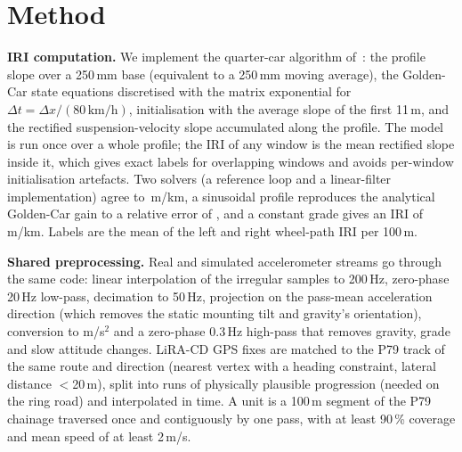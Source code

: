 \section{Method}
\label{sec:method}

\textbf{IRI computation.}
We implement the quarter-car algorithm of~\cite{sayers1995iri,astm_e1926}: the profile slope over a 250\,mm base (equivalent to a 250\,mm moving average), the Golden-Car state equations discretised with the matrix exponential for $\Delta t = \Delta x/(80\,\mathrm{km/h})$, initialisation with the average slope of the first 11\,m, and the rectified suspension-velocity slope accumulated along the profile.
The model is run once over a whole profile; the IRI of any window is the mean rectified slope inside it, which gives exact labels for overlapping windows and avoids per-window initialisation artefacts.
Two solvers (a reference loop and a linear-filter implementation) agree to \iriSolverDev\,m/km, a sinusoidal profile reproduces the analytical Golden-Car gain to a relative error of \iriSineDev, and a constant grade gives an IRI of \iriRampIri\,m/km.
Labels are the mean of the left and right wheel-path IRI per 100\,m.

\textbf{Shared preprocessing.}
Real and simulated accelerometer streams go through the same code: linear interpolation of the irregular samples to 200\,Hz, zero-phase 20\,Hz low-pass, decimation to 50\,Hz, projection on the pass-mean acceleration direction (which removes the static mounting tilt and gravity's orientation), conversion to m/s$^2$ and a zero-phase 0.3\,Hz high-pass that removes gravity, grade and slow attitude changes.
LiRA-CD GPS fixes are matched to the P79 track of the same route and direction (nearest vertex with a heading constraint, lateral distance $<$20\,m), split into runs of physically plausible progression (needed on the ring road) and interpolated in time.
A unit is a 100\,m segment of the P79 chainage traversed once and contiguously by one pass, with at least 90\,\% coverage and mean speed of at least 2\,m/s.


